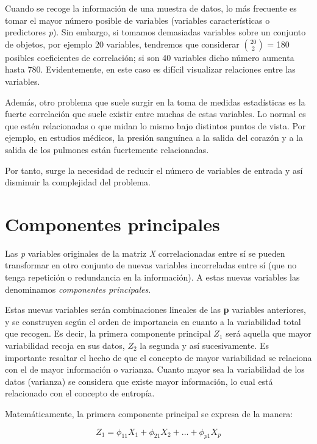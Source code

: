\documentclass[12pt,a4paper,Spanish]{book}
\begin{document}
Cuando se recoge la información de una muestra de datos, lo más frecuente es tomar el
mayor número posible de variables (variables características o predictores \textit{p}). Sin embargo, si tomamos demasiadas variables sobre
un conjunto de objetos, por ejemplo 20 variables, tendremos que considerar $20 \choose 2$ = 180 
posibles coeficientes de correlación; si son 40 variables dicho número aumenta hasta 780.
Evidentemente, en este caso es difícil visualizar relaciones entre las variables.

Además, otro problema que suele surgir en la toma de medidas estadísticas es la fuerte correlación que suele existir entre muchas de estas variables. Lo normal es que estén relacionadas o que midan lo mismo bajo distintos puntos de vista. Por ejemplo, en
estudios médicos, la presión sanguínea a la salida del corazón y a la salida de los pulmones
están fuertemente relacionadas. 

Por tanto, surge la necesidad de reducir el número de variables de entrada y así disminuir la complejidad del problema.


\section{Componentes principales}

Las \textit{p} variables originales de la matriz \textit{X} correlacionadas  entre sí se pueden transformar en otro conjunto de nuevas variables incorreladas entre sí (que no tenga repetición o redundancia en la información). A estas nuevas variables las denominamos \textit{componentes principales}.

Estas nuevas variables serán combinaciones lineales de las \textbf{p} variables anteriores, y se construyen según el orden de importancia en cuanto a la variabilidad total que recogen. Es decir, la primera componente principal $Z_1$ será aquella que mayor variabilidad recoja en sus datos, $Z_2$ la segunda y así sucesivamente. Es importante resaltar el hecho de que el concepto de mayor variabilidad se relaciona con el de mayor información o varianza. Cuanto mayor sea la variabilidad de los datos (varianza) se considera que existe mayor información, lo cual está relacionado con el concepto de entropía.

Matemáticamente, la primera componente principal se expresa de la manera:

\begin{equation}
Z_1=\phi_{11}X_1 + \phi_{21}X_2 + ... + \phi_{p1}X_p
\end{equation}
\end{document}
